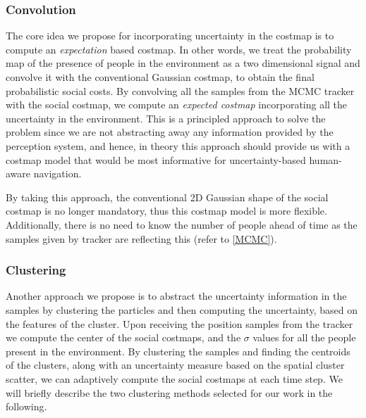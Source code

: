 \subsubsection*{Convolution}

The core idea we propose for incorporating uncertainty in the costmap is to compute an \textit{expectation} based costmap. In other words, we treat the probability map of the presence of people in the environment as a two dimensional signal and convolve it with the conventional Gaussian costmap, to obtain the final probabilistic social costs. By convolving all the samples from the MCMC tracker with the social costmap, we compute an \textit{expected costmap} incorporating all the uncertainty in the environment. This is a principled approach to solve the problem since we are not abstracting away any information provided by the perception system, and hence, in theory this approach should provide us with a costmap model that would be most informative for uncertainty-based human-aware navigation.



   
By taking this approach, the conventional 2D Gaussian shape of the social costmap is no longer mandatory, thus this costmap model is more flexible. Additionally, there is no need to know the number of people ahead of time as the samples given by tracker are reflecting this (refer to \ref{MCMC}). 



\subsubsection*{Clustering}
Another approach we propose is to abstract the uncertainty information in the samples by clustering the particles and then computing the uncertainty, based on the features of the cluster. Upon receiving the position samples from the tracker we compute the center of the social costmaps, and the ${\sigma}$ values for all the people present in the environment. By clustering the samples and finding the centroids of the clusters, along with an uncertainty measure based on the spatial cluster scatter, we can adaptively compute the social costmaps at each time step. We will briefly describe the two clustering methods selected for our work in the following.

